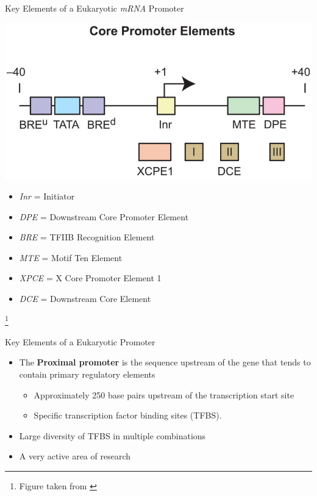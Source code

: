 \documentclass[aspectratio=169,11pt]{beamer}
\newcommand\blfootnote[1]{%
  \begingroup
  \renewcommand\thefootnote{}\footnote{#1}%
  \addtocounter{footnote}{-1}%
  \endgroup
}
\begin{document}
\begin{frame}{Key Elements of a Eukaryotic \textit{mRNA} Promoter}

	\begin{center}
	\includegraphics[scale=0.4]{figures/corePromoter.jpg} \\
	\end{center}

	\begin{itemize}
		\footnotesize
		\item \textit{Inr} = Initiator
		\item \textit{DPE} = Downstream Core Promoter Element
		\item \textit{BRE} = TFIIB Recognition Element
		\item \textit{MTE} = Motif Ten Element
		\item \textit{XPCE} = X Core Promoter Element 1
		\item \textit{DCE} = Downstream Core Element
	\end{itemize}
	
		\blfootnote{Figure taken from \cite{pmid18436437}}

\end{frame}

\begin{frame}{Key Elements of a Eukaryotic Promoter}


	\begin{itemize}
		\item The \textbf{Proximal promoter} is the sequence upstream of the gene that tends to contain primary regulatory elements
		
			\begin{itemize}
			\item Approximately 250 base pairs upstream of the transcription start site
			\item Specific transcription factor binding sites (TFBS).		
			\end{itemize}
			
		\item Large diversity of TFBS in multiple combinations
		\item A very active area of research
	\end{itemize}

	
\end{frame}
\end{document}
